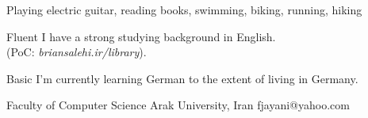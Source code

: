 \documentclass[a4paper,12pt]{memoir} %
\begin{document}
{Playing electric guitar, reading books, swimming, biking, running, hiking}


\Sep %




{Fluent}
{I have a strong studying background in English.\\(PoC: \textit{briansalehi.ir/library}).}

{Basic}
{I'm currently learning German to the extent of living in Germany.}


\Sep %




{Faculty of Computer Science}
{Arak University, Iran}
{fjayani@yahoo.com}




\Sep %
\end{document}
